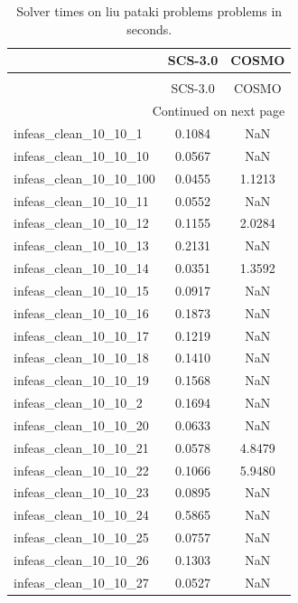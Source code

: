 \begin{longtable}{lcc}
\caption{Solver times on liu pataki problems problems in seconds.}
\label{t-liu pataki problems-results}\\
\toprule
{} &  SCS-3.0 &   COSMO \\
\midrule
\endfirsthead
\caption[]{Solver times on liu pataki problems problems in seconds.} \\
\toprule
{} &  SCS-3.0 &   COSMO \\
\midrule
\endhead
\midrule
\multicolumn{3}{r}{{Continued on next page}} \\
\midrule
\endfoot

\bottomrule
\endlastfoot
infeas\_clean\_10\_10\_1   &   0.1084 &     NaN \\
infeas\_clean\_10\_10\_10  &   0.0567 &     NaN \\
infeas\_clean\_10\_10\_100 &   0.0455 &  1.1213 \\
infeas\_clean\_10\_10\_11  &   0.0552 &     NaN \\
infeas\_clean\_10\_10\_12  &   0.1155 &  2.0284 \\
infeas\_clean\_10\_10\_13  &   0.2131 &     NaN \\
infeas\_clean\_10\_10\_14  &   0.0351 &  1.3592 \\
infeas\_clean\_10\_10\_15  &   0.0917 &     NaN \\
infeas\_clean\_10\_10\_16  &   0.1873 &     NaN \\
infeas\_clean\_10\_10\_17  &   0.1219 &     NaN \\
infeas\_clean\_10\_10\_18  &   0.1410 &     NaN \\
infeas\_clean\_10\_10\_19  &   0.1568 &     NaN \\
infeas\_clean\_10\_10\_2   &   0.1694 &     NaN \\
infeas\_clean\_10\_10\_20  &   0.0633 &     NaN \\
infeas\_clean\_10\_10\_21  &   0.0578 &  4.8479 \\
infeas\_clean\_10\_10\_22  &   0.1066 &  5.9480 \\
infeas\_clean\_10\_10\_23  &   0.0895 &     NaN \\
infeas\_clean\_10\_10\_24  &   0.5865 &     NaN \\
infeas\_clean\_10\_10\_25  &   0.0757 &     NaN \\
infeas\_clean\_10\_10\_26  &   0.1303 &     NaN \\
infeas\_clean\_10\_10\_27  &   0.0527 &     NaN \\

\end{longtable}

